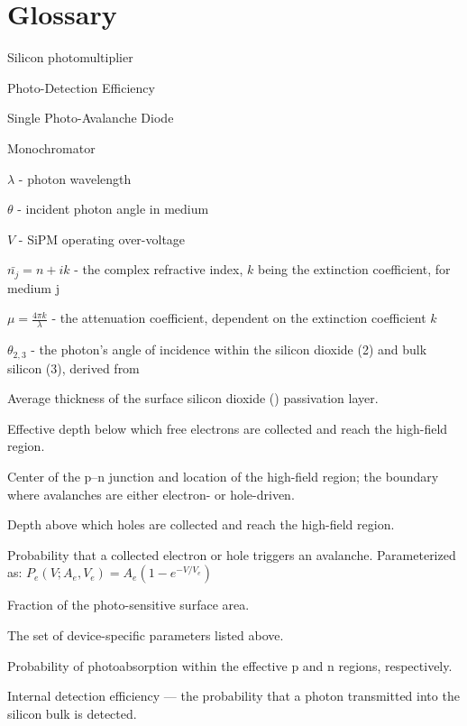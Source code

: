 \section*{Glossary}

\begin{description}[leftmargin=2.5cm, labelindent=0cm]

\item[SiPM] Silicon photomultiplier
\item[PDE] Photo-Detection Efficiency
\item[SPAD] Single Photo-Avalanche Diode
\item[MC] Monochromator

\item $\lambda$ - photon wavelength
\item $\theta$ - incident photon angle in medium
\item $V$ - SiPM operating over-voltage

\item $\bar{n_j} = n+ik$ - the complex refractive index, $k$ being the extinction coefficient, for medium j
\item $\mu = \frac{4\pi k}{\lambda}$ - the attenuation coefficient, dependent on the extinction coefficient $k$
\item $\theta_{2, 3}$ - the photon's angle of incidence within the silicon dioxide (2) and bulk silicon (3), derived from

\item[$\tox$] Average thickness of the surface silicon dioxide () passivation layer.

\item[$dp^*$] Effective depth below which free electrons are collected and reach the high-field region.

\item[$X_{PN}$] Center of the p–n junction and location of the high-field region; the boundary where avalanches are either electron- or hole-driven.

\item[$dw^*$] Depth above which holes are collected and reach the high-field region.

\item[$P_e(V), P_h(V)$] Probability that a collected electron or hole triggers an avalanche. Parameterized as: $P_e(V; A_e, V_e) = A_e\left(1 - e^{-V / V_e}\right)$

\item[$FF$] Fraction of the photo-sensitive surface area.

\item[$\bm{J}$] The set of device-specific parameters listed above.

\item[$W_p, W_n$] Probability of photoabsorption within the effective p and n regions, respectively.

\item[$iPDE$] Internal detection efficiency — the probability that a photon transmitted into the silicon bulk is detected.


\end{description}
